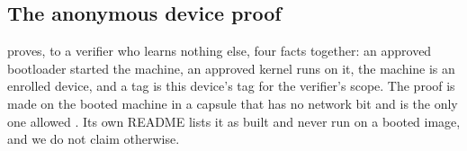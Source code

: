 \subsection{The anonymous device proof}

 proves, to a verifier who learns nothing else, four facts together: an approved bootloader started the machine, an approved kernel runs on it, the machine is an enrolled device, and a tag is this device's tag for the verifier's scope. The proof is made on the booted machine in a capsule that has no network bit and is the only one allowed . Its own README lists it as built and never run on a booted image, and we do not claim otherwise.
